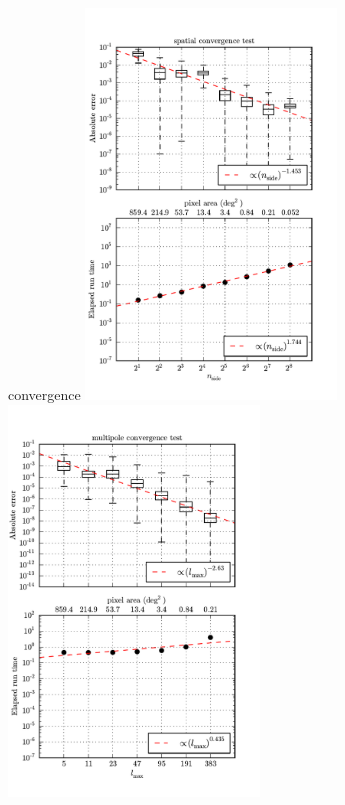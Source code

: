 \documentclass[portrait]{a0poster}
\begin{document}
\begin{staticcontents*}{convergence}
\includegraphics[width=0.5\textwidth]{spatial}
\includegraphics[width=0.5\textwidth]{multipole}
\end{staticcontents*}
\end{document}
